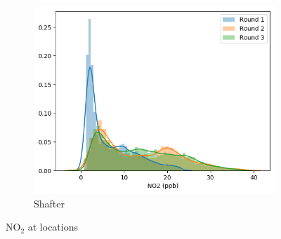 \documentclass[journal abbreviation, manuscript]{copernicus}
\newcommand{\textus}[1]{$_{\text{#1}}$}
\begin{document}
\begin{figure}[H]
\begin{subfigure}{0.32\textwidth}
\includegraphics[width=\textwidth]{results/distributions/location_shafter_no2.png}
\caption{Shafter}
\end{subfigure}
\caption{NO\textus{2} at locations}
\label{fig:no2-locations}
\end{figure}

\fi
\end{document}
